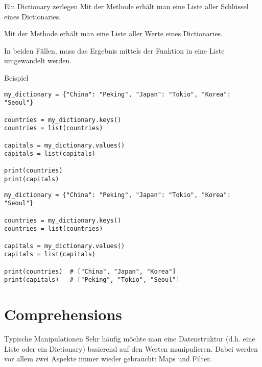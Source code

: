 \begin{fragile}

\begin{block}{Ein Dictionary zerlegen}
\vspace{2pt}
Mit der Methode  erhält man eine Liste aller Schlüssel eines Dictionaries. \pause

Mit der Methode  erhält man eine Liste aller Werte eines Dictionaries. \pause 

In beiden Fällen, muss das Ergebnis mittels der Funktion  in eine Liste umgewandelt werden. 
\end{block}


\vspace{12pt}
\pause 

\begin{exampleblock}{Beispiel}
\vspace{2pt}
\begin{overprint}
\begin{verbatim}
my_dictionary = {"China": "Peking", "Japan": "Tokio", "Korea": "Seoul"}

countries = my_dictionary.keys()
countries = list(countries)

capitals = my_dictionary.values()
capitals = list(capitals)

print(countries)
print(capitals)
\end{verbatim}
\begin{verbatim}
my_dictionary = {"China": "Peking", "Japan": "Tokio", "Korea": "Seoul"}

countries = my_dictionary.keys()
countries = list(countries)

capitals = my_dictionary.values()
capitals = list(capitals)

print(countries)  # ["China", "Japan", "Korea"]
print(capitals)   # ["Peking", "Tokio", "Seoul"]
\end{verbatim}
\end{overprint}
\end{exampleblock}
\end{fragile}


\section{Comprehensions}

\begin{frame}
\begin{block}{Typische Manipulationen}
\vspace{2pt}
Sehr häufig möchte man eine Datenstruktur (d.h. eine Liste oder ein Dictionary) basierend auf den Werten manipulieren. Dabei werden vor allem zwei Aspekte immer wieder gebraucht: Maps und Filter. 
\end{block}

\end{frame}


